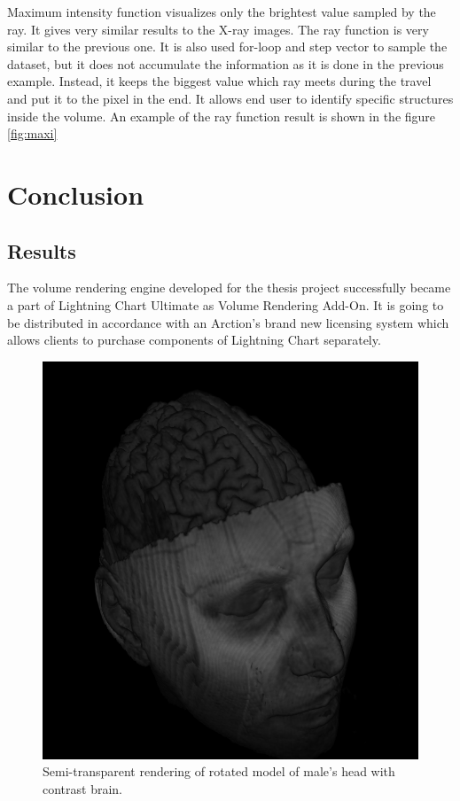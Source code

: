 \documentclass[twoside, english, 11pt]{report}
\begin{document}
Maximum intensity function visualizes only the brightest value sampled by the ray. It gives very similar results to the X-ray images. The ray function is very similar to the previous one. It is also used for-loop and step vector to sample the dataset, but it does not accumulate the information as it is done in the previous example. Instead, it keeps the biggest value which ray meets during the travel and put it to the pixel in the end. It allows end user to identify specific structures inside the volume. An example of the ray function result is shown in the figure \ref{fig:maxi}







\chapter{Conclusion}
\section{Results}
The volume rendering engine developed for the thesis project successfully became a part of Lightning Chart Ultimate as Volume Rendering Add-On. It is going to be distributed in accordance with an Arction's brand new licensing system which allows clients to purchase components of Lightning Chart separately.\\

\begin{figure}[H]
\centerline{\includegraphics[scale = 0.6]{img/brain}}
\caption{Semi-transparent rendering of rotated model of male's head with contrast brain.\label{fig:brain}}
\end{figure}
\end{document}
